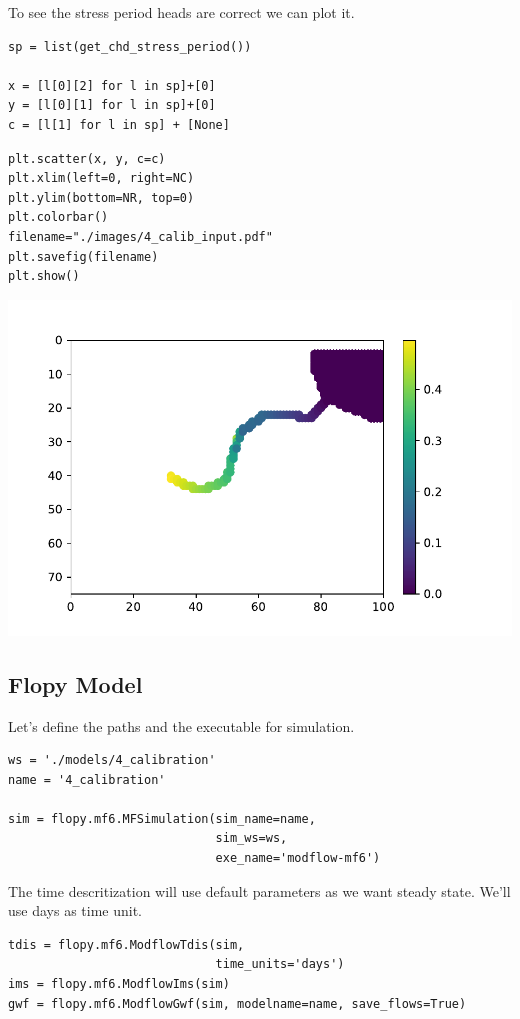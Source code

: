 \documentclass[titlepage,12pt]{unisubmission}
\begin{document}
To see the stress period heads are correct we can plot it.
\begin{verbatim}
sp = list(get_chd_stress_period())

x = [l[0][2] for l in sp]+[0]
y = [l[0][1] for l in sp]+[0]
c = [l[1] for l in sp] + [None]
\end{verbatim}


\begin{verbatim}
plt.scatter(x, y, c=c)
plt.xlim(left=0, right=NC)
plt.ylim(bottom=NR, top=0)
plt.colorbar()
filename="./images/4_calib_input.pdf"
plt.savefig(filename)
plt.show()
\end{verbatim}

\begin{center}
\includegraphics[width=.9\linewidth]{./images/4_calib_input.pdf}
\end{center}

\subsection{Flopy Model}
\label{sec:orgf7d3bdb}

Let's define the paths and the executable for simulation.

\begin{verbatim}
ws = './models/4_calibration'
name = '4_calibration'

sim = flopy.mf6.MFSimulation(sim_name=name,
                             sim_ws=ws,
                             exe_name='modflow-mf6')
\end{verbatim}

The time descritization will use default parameters as we want steady state. We'll use days as time unit.

\begin{verbatim}
tdis = flopy.mf6.ModflowTdis(sim,
                             time_units='days')
ims = flopy.mf6.ModflowIms(sim)
gwf = flopy.mf6.ModflowGwf(sim, modelname=name, save_flows=True)
\end{verbatim}
\end{document}
